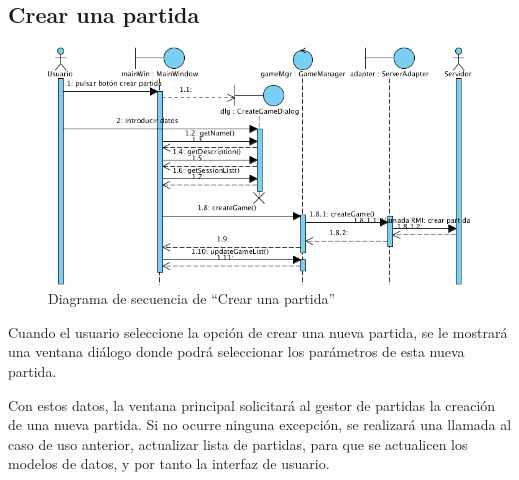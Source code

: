 \subsection{Crear una partida}

\begin{figure}[ht]
\centering
\includegraphics[scale=0.6]{img/ch03devel-creategame.png}
\caption{Diagrama de secuencia de ``Crear una partida''}
\end{figure}

Cuando el usuario seleccione la opción de crear una nueva partida, se le
mostrará una ventana diálogo donde podrá seleccionar los parámetros de esta
nueva partida.

Con estos datos, la ventana principal solicitará al gestor de partidas la
creación de una nueva partida. Si no ocurre ninguna excepción, se realizará una
llamada al caso de uso anterior, actualizar lista de partidas, para que se
actualicen los modelos de datos, y por tanto la interfaz de usuario.
